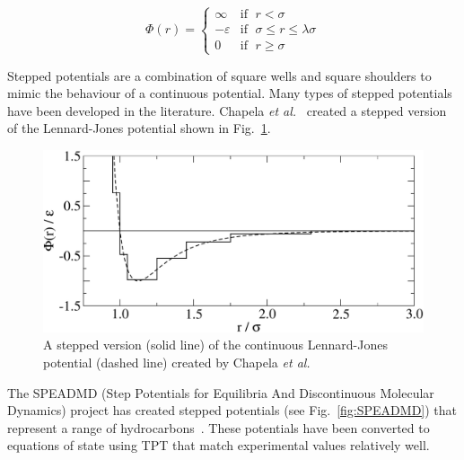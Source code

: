 \documentclass[12pt]{UoAthesis} \usepackage{booktabs}
\begin{document}
\begin{equation}
  \label{eq:potentialSW}
  \Phi(r) = 
  \begin{cases}
    \infty &\text{if }\; r < \sigma \\
    -\varepsilon &\text{if }\; \sigma \leq r \leq \lambda \sigma \\
    0 &\text{if }\; r \geq \sigma
  \end{cases}
\end{equation}

Stepped potentials are a combination of square wells and square
shoulders to mimic the behaviour of a continuous potential.  Many
types of stepped potentials have been developed in the literature.
Chapela \textit{et al.}~\cite{Chapela1989} created a stepped version
of the Lennard-Jones potential shown in Fig.~\ref{fig:chapelasteps}.

\begin{figure}[htp] 
  \begin{center}
    \includegraphics[clip,scale = 0.45]{figures/Chapela_Steps} 
    \caption[Plot of steps create by Chapela \textit{et al.}]
    {\label{fig:chapelasteps} A stepped version (solid line) of the
      continuous Lennard-Jones potential (dashed line) created by Chapela
      \textit{et al.}}
  \end{center}
\end{figure}

The SPEADMD (Step Potentials for Equilibria And Discontinuous
Molecular Dynamics) project has created
stepped potentials (see Fig.~\ref{fig:SPEADMD}) that represent a range
of hydrocarbons~\cite{ElliotJr2002, Unlu2004, Vahid2010}.  These
potentials have been converted to equations of state using TPT that
match experimental values relatively well.
\end{document}
